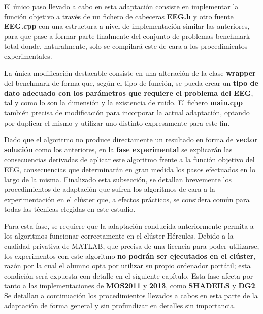 \begin{enumerate}
	El único paso llevado a cabo en esta adaptación consiste en implementar la función objetivo a través de un fichero de cabeceras \textbf{EEG.h} y otro fuente \textbf{EEG.cpp} con una estructura a nivel de implementación similar las anteriores, para que pase a formar parte finalmente del conjunto de problemas benchmark total donde, naturalmente, solo se compilará este de cara a los procedimientos experimentales. 
	
	La única modificación destacable consiste en una alteración de la clase \textbf{wrapper} del benchmark de forma que, según el tipo de función, se pueda crear un \textbf{tipo de dato adecuado con los parámetros que requiere el problema del EEG}, tal y como lo son la dimensión y la existencia de ruido. El fichero \textbf{main.cpp} también precisa de modificación para incorporar la actual adaptación, optando por duplicar el mismo y utilizar uno distinto expresamente para este fin.
	
	Dado que el algoritmo no produce directamente un resultado en forma de \textbf{vector solución} como los anteriores, en la \textbf{fase experimental} se explicarán las consecuencias derivadas de aplicar este algoritmo frente a la función objetivo del EEG, consecuencias que determinarán en gran medida los pasos efectuados en lo largo de la misma. Finalizado esta subsección, se detallan brevemente los procedimientos de adaptación que sufren los algoritmos de cara a la experimentación en el clúster que, a efectos prácticos, se considera común para todas las técnicas elegidas en este estudio.
	
\end{enumerate}


Para esta fase, se requiere que la adaptación conducida anteriormente permita a los algoritmos funcionar correctamente en el clúster Hércules. Debido a la cualidad privativa de MATLAB, que precisa de una licencia para poder utilizarse, los experimentos con este algoritmo \textbf{no podrán ser ejecutados en el clúster}, razón por la cual el alumno opta por utilizar su propio ordenador portátil; esta condición será expuesta con detalle en el siguiente capítulo. Esta fase afecta por tanto a las implementaciones de \textbf{MOS2011} y \textbf{2013}, como \textbf{SHADEILS} y \textbf{DG2}. Se detallan a continuación los procedimientos llevados a cabos en esta parte de la adaptación de forma general y sin profundizar en detalles sin importancia.

